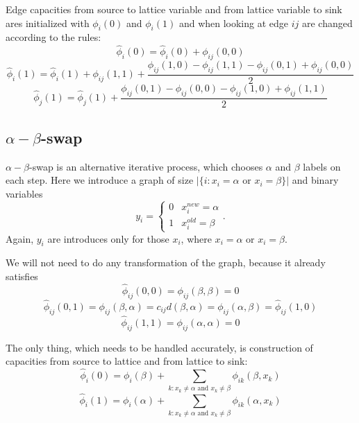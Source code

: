 \documentclass[paper=a4, fontsize=11pt]{scrartcl} %
\numberwithin{equation}{section} %
\numberwithin{figure}{section} %
\numberwithin{table}{section} %
\begin{document}
Edge capacities from source to lattice variable and from lattice variable to sink ares initialized with $\phi_i(0)$ and $\phi_i(1)$ and when looking at edge $ij$ are changed according to the rules:
$$\hat{\phi}_{i}(0) = \hat{\phi}_{i}(0) + \phi_{ij}(0, 0)$$
$$\hat{\phi}_{i}(1) = \hat{\phi}_{i}(1) + \phi_{ij}(1, 1) + \dfrac{\phi_{ij}(1, 0) - \phi_{ij}(1, 1) - \phi_{ij}(0, 1) + \phi_{ij}(0, 0)}{2}$$
$$\hat{\phi}_{j}(1) = \hat{\phi}_{j}(1) + \dfrac{\phi_{ij}(0, 1) - \phi_{ij}(0, 0) - \phi_{ij}(1, 0) + \phi_{ij}(1, 1)}{2}$$

\subsection*{$\alpha-\beta$-swap}
$\alpha-\beta$-swap is an alternative iterative process, which chooses $\alpha$ and $\beta$ labels on each step.
Here we introduce a graph of size $| \{ i : x_i = \alpha \text{ or } x_i = \beta \} |$ and binary variables
$$y_i = \begin{cases}
0 & x_i^{new} = \alpha \\
1 & x_i^{old} = \beta
\end{cases}.$$
Again, $y_i$ are introduces only for those $x_i$, where $x_i = \alpha$ or $x_i = \beta$.

We will not need to do any transformation of the graph, because it already satisfies
$$\hat{\phi}_{ij}(0, 0) = \phi_{ij}(\beta, \beta) = 0$$
$$\hat{\phi}_{ij}(0, 1) = \phi_{ij}(\beta, \alpha) = c_{ij}d(\beta, \alpha) = \phi_{ij}(\alpha, \beta) = \hat{\phi}_{ij}(1, 0)$$
$$\hat{\phi}_{ij}(1, 1) = \phi_{ij}(\alpha, \alpha) = 0$$

The only thing, which needs to be handled accurately, is construction of capacities from source to lattice and from lattice to sink:
$$\hat{\phi}_i(0) = \phi_i(\beta) + \sum\limits_{k: x_k \neq \alpha \text{ and } x_k \neq \beta} \phi_{ik}(\beta, x_k)$$
$$\hat{\phi}_i(1) = \phi_i(\alpha) + \sum\limits_{k: x_k \neq \alpha \text{ and } x_k \neq \beta} \phi_{ik}(\alpha, x_k)$$
\end{document}
